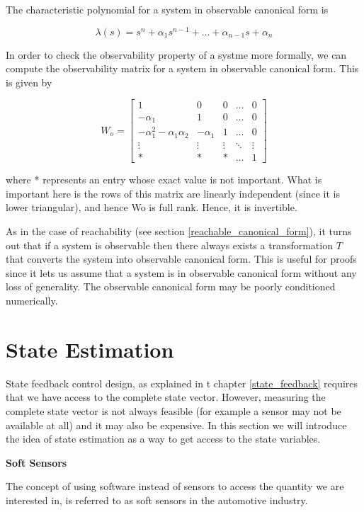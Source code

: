 The characteristic polynomial for a system in observable canonical form is

\begin{equation}
\lambda(s) = s^n +\alpha_1s^{n-1} + \ldots + \alpha_{n-1}s + \alpha_n
\end{equation}

In order to check the observability property of a systme more formally, we can compute the observability matrix for
a system in observable canonical form. This is given by

\begin{equation}
W_o= 
\begin{bmatrix}
 1 & 0 & 0 & \ldots &  0\\
 -\alpha_1 & 1 & 0 & \ldots &  0 \\
 -\alpha_{1}^{2} - \alpha_1 \alpha_2 & - \alpha_1 & 1 &  \ldots &  0 \\
 \vdots & \vdots & \vdots & \ddots & \vdots \\
* & * & * & \ldots & 1
\end{bmatrix} 
\end{equation}


where * represents  an entry  whose exact  value  is  not important.
What is important here is the rows of this matrix are linearly independent (since it is lower triangular), and hence Wo is full rank. Hence, it is invertible. 

As in the case of reachability (see section \ref{reachable_canonical_form}), it  turns  out  that  if a  system  is  observable then there
always exists a transformation $T$ that converts the system into observable canonical
form. This is useful for proofs since it lets us assume that a system is in observable
canonical form without any loss of generality. The observable canonical form may
be poorly conditioned numerically.
 

\section{State Estimation}
State feedback control design, as explained in t chapter \ref{state_feedback} requires that we have access to the complete state vector. 
However, measuring the complete state vector is not always feasible (for example a sensor may not be available at all) and it may also be expensive.
In this section we will introduce the idea of state estimation as a way to get access to the state variables. 


\begin{framed}
\theoremstyle{remark}
\begin{remark}{\textbf{Soft Sensors}}


The concept of using software instead of sensors to access the quantity we are 
interested in, is referred to as soft sensors in the automotive industry.
\end{remark}
\end{framed}

